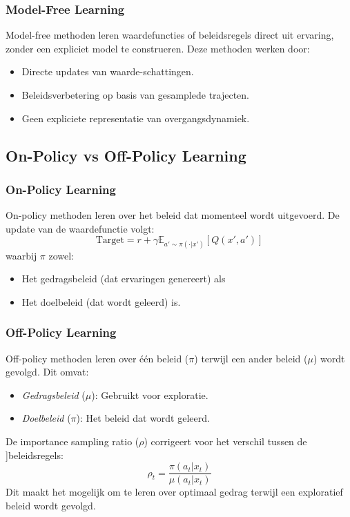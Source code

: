 \documentclass[a4paper,12pt]{report}
\begin{document}
\subsubsection{Model-Free Learning}
Model-free methoden leren waardefuncties of beleidsregels direct uit ervaring,
zonder een expliciet model te construeren. Deze methoden werken door:

\begin{itemize}
    \item Directe updates van waarde-schattingen.
    \item Beleidsverbetering op basis van gesamplede trajecten.
    \item Geen expliciete representatie van overgangsdynamiek.
\end{itemize}

\subsection{On-Policy vs Off-Policy Learning}
\subsubsection{On-Policy Learning}
On-policy methoden leren over het beleid dat momenteel wordt uitgevoerd. De
update van de waardefunctie volgt:
\[
    \text{Target} = r + \gamma \mathbb{E}_{a' \sim \pi(\cdot|x')}[Q(x',a')]
\]
waarbij \(\pi\) zowel:

\begin{itemize}
    \item Het gedragsbeleid (dat ervaringen genereert) als
    \item Het doelbeleid (dat wordt geleerd) is.
\end{itemize}

\subsubsection{Off-Policy Learning}
Off-policy methoden leren over één beleid (\(\pi\)) terwijl een ander beleid
(\(\mu\)) wordt gevolgd. Dit omvat:

\begin{itemize}
    \item \textit{Gedragsbeleid} (\(\mu\)): Gebruikt voor exploratie.
    \item \textit{Doelbeleid} (\(\pi\)): Het beleid dat wordt geleerd.
\end{itemize}

De importance sampling ratio (\(\rho\)) corrigeert voor het verschil tussen de
]beleidsregels:
\[
    \rho_t = \frac{\pi(a_t|x_t)}{\mu(a_t|x_t)}
\]
Dit maakt het mogelijk om te leren over optimaal gedrag terwijl een exploratief
beleid wordt gevolgd.
\end{document}

